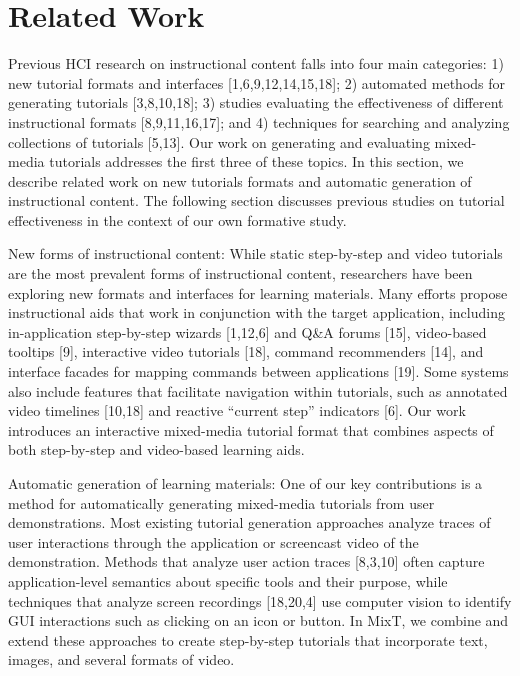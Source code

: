 \section{Related Work}

Previous HCI research on instructional content falls into four main categories: 1) new tutorial formats and interfaces [1,6,9,12,14,15,18]; 2) automated methods for generating tutorials [3,8,10,18]; 3) studies evaluating the effectiveness of different instructional formats [8,9,11,16,17]; and 4) techniques for searching and analyzing collections of tutorials [5,13]. Our work on generating and evaluating mixed-media tutorials addresses the first three of these topics. In this section, we describe related work on new tutorials formats and automatic generation of instructional content. The following section discusses previous studies on tutorial effectiveness in the context of our own formative study.

New forms of instructional content: While static step-by-step and video tutorials are the most prevalent forms of instructional content, researchers have been exploring new formats and interfaces for learning materials. Many efforts propose instructional aids that work in conjunction with the target application, including in-application step-by-step wizards [1,12,6] and Q\&A forums [15], video-based tooltips [9], interactive video tutorials [18], command recommenders [14], and interface facades for mapping commands between applications [19]. Some systems also include features that facilitate navigation within tutorials, such as annotated video timelines [10,18] and reactive “current step” indicators [6]. Our work introduces an interactive mixed-media tutorial format that combines aspects of both step-by-step and video-based learning aids. \

Automatic generation of learning materials: One of our key contributions is a method for automatically generating mixed-media tutorials from user demonstrations. Most existing tutorial generation approaches analyze traces of user interactions through the application or screencast video of the demonstration. Methods that analyze user action traces [8,3,10] often capture application-level semantics about specific tools and their purpose, while techniques that analyze screen recordings [18,20,4] use computer vision to identify GUI interactions such as clicking on an icon or button. In MixT, we combine and extend these approaches to create step-by-step tutorials that incorporate text, images, and several formats of video.
